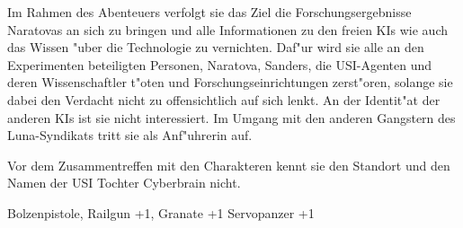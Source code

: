 Im Rahmen des Abenteuers verfolgt sie das Ziel die Forschungsergebnisse Naratovas an sich zu bringen und alle Informationen zu den freien KIs wie auch das Wissen "uber die Technologie zu vernichten. Daf"ur wird sie alle an den Experimenten beteiligten Personen, Naratova, Sanders, die USI-Agenten und deren Wissenschaftler t"oten und Forschungseinrichtungen zerst"oren, solange sie dabei den Verdacht nicht zu offensichtlich auf sich lenkt. An der Identit"at der anderen KIs ist sie nicht interessiert. Im Umgang mit den anderen Gangstern des Luna-Syndikats tritt sie als Anf"uhrerin auf.

Vor dem Zusammentreffen mit den Charakteren kennt sie den Standort und den Namen der USI Tochter Cyberbrain nicht.

\begin{nscsheet}[f]{\xls}
    \nscstats[ATT=3,AGG=3,DEX=2,COM=2,CON=2]
    \nscruler
    \begin{nscinventory}
        \nscitem[Waffen] Bolzenpistole, Railgun +1, Granate +1
        \nscitem[R"ustung] Servopanzer +1
    \end{nscinventory}
\end{nscsheet}
